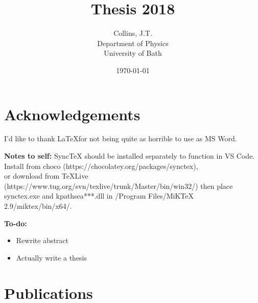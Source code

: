 \documentclass[11pt,a4paper,final]{report}
\title{Thesis 2018}
\author{
	Collins, J.T. \\ 
	Department of Physics\\
	University of Bath\\
}
\date{\today}
\begin{document}
\begin{titlepage}
    
\end{titlepage}


\begin{abstract}
    
\end{abstract}
\clearpage


\clearpage
\tableofcontents
\clearpage


\chapter*{Acknowledgements}

\color{red}
I'd like to thank \LaTeX  for not being quite as horrible to use as MS Word.

\noindent\textbf{Notes to self:}
\noindent SyncTeX should be installed separately to function in VS Code. 
\noindent Install from choco (https://chocolatey.org/packages/synctex), \\or download from TeXLive (https://www.tug.org/svn/texlive/trunk/Master/bin/win32/) then place synctex.exe and kpathsea***.dll in /Program Files/MiKTeX 2.9/miktex/bin/x64/.

\noindent\textbf{To-do:}
\begin{itemize}
	\item Rewrite abstract
    \item Actually write a thesis
\end{itemize}
\color{black}

\chapter*{Publications}


\bigskip \noindent {}

\bigskip \noindent {}

\bigskip \noindent {}

\bigskip \noindent {}










\end{document}

